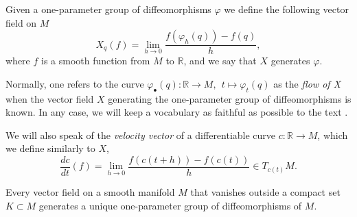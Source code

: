 \bigskip

Given a one-parameter group of diffeomorphisms $\varphi$ we define the following vector field on $M$
\begin{equation*}
    X_q(f)=\lim_{h\to 0}\frac{f(\varphi_h(q))-f(q)}{h},
\end{equation*}
where $f$ is a smooth function from $M$ to $\mathbb{R}$, and we say that $X$ generates $\varphi$.

Normally, one refers to the curve $\varphi_\bullet(q): \mathbb{R}\to M,~~ t\mapsto \varphi_t(q)$ as the \textit{flow of X} when the vector field $X$ generating the one-parameter group of diffeomorphisms is known. In any case, we will keep a vocabulary as faithful as possible to the text \cite{milnor1963}.

We will also speak of the \textit{velocity vector} of a differentiable curve $c:\mathbb{R}\to M$, which we define similarly to $X$,
\begin{equation*}
    \frac{dc}{dt}(f)= \lim_{h\to 0}\frac{f(c(t+h))-f(c(t))}{h}\in T_{c(t)}M .
\end{equation*}

\bigskip
\begin{lemma}
\label{unidiff}
    Every vector field on a smooth manifold $M$ that vanishes outside a compact set $K\subset M$ generates a unique one-parameter group of diffeomorphisms of $M$.
\end{lemma}

